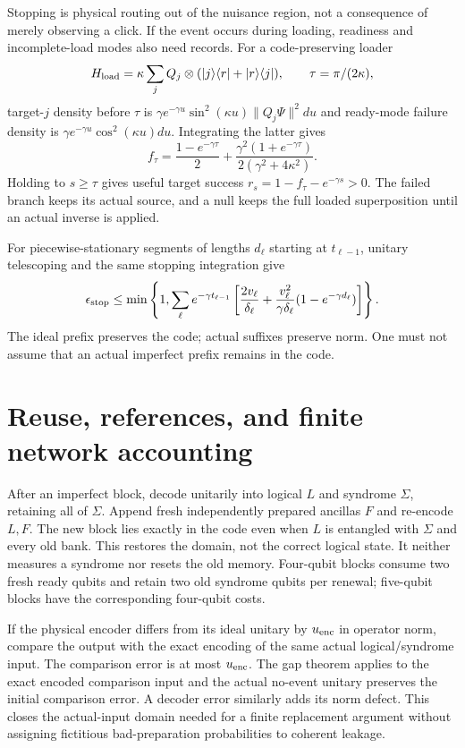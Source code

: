 \documentclass[11pt,oneside,openany]{book}
\theoremstyle{definition}
\theoremstyle{remark}\newtheorem{remark}[theorem]{Remark}
\begin{document}
Stopping is physical routing out of the nuisance region, not a consequence of merely observing a click. If the event occurs during loading, readiness and incomplete-load modes also need records. For a code-preserving loader
\[
 H_{\rm load}=\kappa\sum_jQ_j\otimes(|j\rangle\langle r|+|r\rangle\langle j|),
 \qquad\tau=\pi/(2\kappa),
\]
target-$j$ density before $\tau$ is
$\gamma e^{-\gamma u}\sin^2(\kappa u)\|Q_j\Psi\|^2du$ and ready-mode failure density is $\gamma e^{-\gamma u}\cos^2(\kappa u)du$. Integrating the latter gives
\begin{equation}
 f_\tau=\frac{1-e^{-\gamma\tau}}2+
       \frac{\gamma^2(1+e^{-\gamma\tau})}{2(\gamma^2+4\kappa^2)}.
 \label{prot:loadingfailure}
\end{equation}
Holding to $s\ge\tau$ gives useful target success $r_s=1-f_\tau-e^{-\gamma s}>0$. The failed branch keeps its actual source, and a null keeps the full loaded superposition until an actual inverse is applied.

For piecewise-stationary segments of lengths $d_\ell$ starting at $t_{\ell-1}$, unitary telescoping and the same stopping integration give
\begin{equation}
 \epsilon_{\rm stop}\le\min\left\{1,
 \sum_\ell e^{-\gamma t_{\ell-1}}
 \left[\frac{2v_\ell}{\delta_\ell}
 +\frac{v_\ell^2}{\gamma\delta_\ell}(1-e^{-\gamma d_\ell})\right]\right\}.
 \label{prot:segments}
\end{equation}
The ideal prefix preserves the code; actual suffixes preserve norm. One must not assume that an actual imperfect prefix remains in the code.

\section{Reuse, references, and finite network accounting}

After an imperfect block, decode unitarily into logical $L$ and syndrome $\Sigma$, retaining all of $\Sigma$. Append fresh independently prepared ancillas $F$ and re-encode $L,F$. The new block lies exactly in the code even when $L$ is entangled with $\Sigma$ and every old bank. This restores the domain, not the correct logical state. It neither measures a syndrome nor resets the old memory. Four-qubit blocks consume two fresh ready qubits and retain two old syndrome qubits per renewal; five-qubit blocks have the corresponding four-qubit costs.

If the physical encoder differs from its ideal unitary by $u_{\rm enc}$ in operator norm, compare the output with the exact encoding of the same actual logical/syndrome input. The comparison error is at most $u_{\rm enc}$. The gap theorem applies to the exact encoded comparison input and the actual no-event unitary preserves the initial comparison error. A decoder error similarly adds its norm defect. This closes the actual-input domain needed for a finite replacement argument without assigning fictitious bad-preparation probabilities to coherent leakage.
\end{document}
